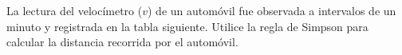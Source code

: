 \item La lectura del velocímetro ($v$) de un automóvil fue observada a intervalos de un minuto y registrada en la tabla siguiente. Utilice la regla de Simpson para calcular la distancia recorrida por el automóvil.
